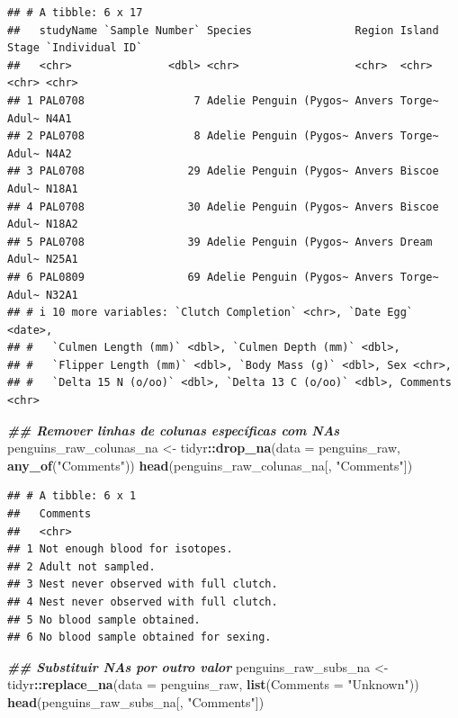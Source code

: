 \documentclass[
]{article}
\newenvironment{Shaded}{\begin{snugshade}}{\end{snugshade}}
\newcommand{\AttributeTok}[1]{\textcolor[rgb]{0.13,0.29,0.53}{#1}}
\newcommand{\DocumentationTok}[1]{\textcolor[rgb]{0.56,0.35,0.01}{\textbf{\textit{#1}}}}
\newcommand{\FunctionTok}[1]{\textcolor[rgb]{0.13,0.29,0.53}{\textbf{#1}}}
\newcommand{\NormalTok}[1]{#1}
\newcommand{\OtherTok}[1]{\textcolor[rgb]{0.56,0.35,0.01}{#1}}
\newcommand{\SpecialCharTok}[1]{\textcolor[rgb]{0.81,0.36,0.00}{\textbf{#1}}}
\newcommand{\StringTok}[1]{\textcolor[rgb]{0.31,0.60,0.02}{#1}}
\begin{document}
\begin{verbatim}
## # A tibble: 6 x 17
##   studyName `Sample Number` Species                Region Island Stage `Individual ID`
##   <chr>               <dbl> <chr>                  <chr>  <chr>  <chr> <chr>          
## 1 PAL0708                 7 Adelie Penguin (Pygos~ Anvers Torge~ Adul~ N4A1           
## 2 PAL0708                 8 Adelie Penguin (Pygos~ Anvers Torge~ Adul~ N4A2           
## 3 PAL0708                29 Adelie Penguin (Pygos~ Anvers Biscoe Adul~ N18A1          
## 4 PAL0708                30 Adelie Penguin (Pygos~ Anvers Biscoe Adul~ N18A2          
## 5 PAL0708                39 Adelie Penguin (Pygos~ Anvers Dream  Adul~ N25A1          
## 6 PAL0809                69 Adelie Penguin (Pygos~ Anvers Torge~ Adul~ N32A1          
## # i 10 more variables: `Clutch Completion` <chr>, `Date Egg` <date>,
## #   `Culmen Length (mm)` <dbl>, `Culmen Depth (mm)` <dbl>,
## #   `Flipper Length (mm)` <dbl>, `Body Mass (g)` <dbl>, Sex <chr>,
## #   `Delta 15 N (o/oo)` <dbl>, `Delta 13 C (o/oo)` <dbl>, Comments <chr>
\end{verbatim}

\begin{Shaded}
\begin{Highlighting}[]
\DocumentationTok{\#\# Remover linhas de colunas específicas com NAs}
\NormalTok{penguins\_raw\_colunas\_na }\OtherTok{\textless{}{-}}\NormalTok{ tidyr}\SpecialCharTok{::}\FunctionTok{drop\_na}\NormalTok{(}\AttributeTok{data =}\NormalTok{ penguins\_raw,}
                                          \FunctionTok{any\_of}\NormalTok{(}\StringTok{"Comments"}\NormalTok{))}
\FunctionTok{head}\NormalTok{(penguins\_raw\_colunas\_na[, }\StringTok{"Comments"}\NormalTok{])}
\end{Highlighting}
\end{Shaded}

\begin{verbatim}
## # A tibble: 6 x 1
##   Comments                             
##   <chr>                                
## 1 Not enough blood for isotopes.       
## 2 Adult not sampled.                   
## 3 Nest never observed with full clutch.
## 4 Nest never observed with full clutch.
## 5 No blood sample obtained.            
## 6 No blood sample obtained for sexing.
\end{verbatim}

\begin{Shaded}
\begin{Highlighting}[]
\DocumentationTok{\#\# Substituir NAs por outro valor}
\NormalTok{penguins\_raw\_subs\_na }\OtherTok{\textless{}{-}}\NormalTok{ tidyr}\SpecialCharTok{::}\FunctionTok{replace\_na}\NormalTok{(}\AttributeTok{data =}\NormalTok{ penguins\_raw,}
                                          \FunctionTok{list}\NormalTok{(}\AttributeTok{Comments =} \StringTok{"Unknown"}\NormalTok{))}
\FunctionTok{head}\NormalTok{(penguins\_raw\_subs\_na[, }\StringTok{"Comments"}\NormalTok{])}
\end{Highlighting}
\end{Shaded}
\end{document}
